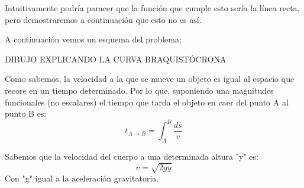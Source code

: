 Intuitivamente podría paracer que la función que cumple esto sería la línea recta, pero demostraremos a continuación que esto no es así.

A continuación vemos un esquema del problema:

DIBUJO EXPLICANDO LA CURVA BRAQUISTÓCRONA

Como sabemos, la velocidad a la que se mueve un objeto es igual al espacio que recore en un tiempo determinado. Por lo que, suponiendo una magnitudes funcionales (no escalares) el tiempo que tarda el objeto en caer del punto A al punto B es:
\begin{equation}
	\label{eq:tiempo}
	t_{A\xrightarrow{}B}=\int_{A}^{B}\frac{ds}{v}
\end{equation}

Sabemos que la velocidad del cuerpo a una determinada altura "y" es:
\begin{equation}
	\label{eq:velocidad_caida}
	v=\sqrt{2gy}
\end{equation}
Con "g" igual a la aceleración gravitatoria.


